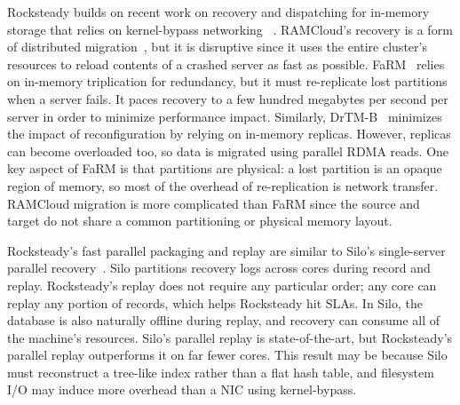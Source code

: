 Rocksteady builds on recent work on recovery and dispatching for
in-memory storage that relies on kernel-bypass networking
~\cite{mica,herd,billions,fasst-2016,rdma-guidelines,ix,arrakis,grappa}.  RAMCloud's
recovery is a form of distributed migration~\cite{ramcloud-recovery},
but
it is disruptive since it uses the entire cluster's resources
to reload contents of a crashed server as fast as possible.
FaRM~\cite{farm-2014,farm-txns} relies on in-memory triplication for redundancy, but
it must re-replicate lost partitions when a server fails. It paces recovery to a
few hundred megabytes per second per server in order to minimize performance
impact. Similarly, DrTM-B~\cite{drtmb} minimizes the impact of reconfiguration by relying on in-memory replicas.
However, replicas can become overloaded too, so
data is migrated using parallel RDMA reads.
One key aspect of FaRM is that partitions are physical: a lost
partition is an opaque region of memory, so most of the overhead of
re-replication is network transfer. RAMCloud migration is more
complicated than FaRM since
the source and target do not share a common partitioning or physical memory layout.

Rocksteady's fast parallel packaging and replay are similar to Silo's
single-server parallel recovery~\cite{silo,silor}. Silo partitions recovery logs
across cores during record and replay.  Rocksteady's replay does not
require any particular order; any core can replay any portion of records,
which helps Rocksteady hit SLAs.  In Silo, the database is also
naturally offline during replay, and recovery can consume all of the
machine's resources. Silo's parallel replay is state-of-the-art, but Rocksteady's
parallel replay outperforms it on far fewer cores. This result may be because Silo
must reconstruct a tree-like index rather than a flat hash table, and
filesystem I/O may induce more overhead than a NIC using kernel-bypass.

%
%


